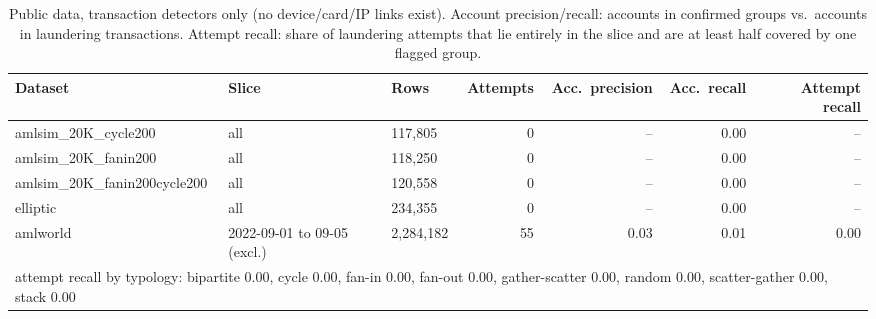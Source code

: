 \begin{table}[t]
\centering
\caption{Public data, transaction detectors only (no device/card/IP links exist). Account precision/recall:
accounts in confirmed groups vs.\ accounts in laundering transactions. Attempt recall: share of laundering
attempts that lie entirely in the slice and are at least half covered by one flagged group.}
\label{tab:public}
\begin{tabular}{lllrrrr}
\toprule
Dataset & Slice & Rows & Attempts & Acc.\ precision & Acc.\ recall & Attempt recall \\
\midrule
amlsim\_20K\_cycle200 & all & 117,805 & 0 & -- & 0.00 & -- \\
amlsim\_20K\_fanin200 & all & 118,250 & 0 & -- & 0.00 & -- \\
amlsim\_20K\_fanin200cycle200 & all & 120,558 & 0 & -- & 0.00 & -- \\
elliptic & all & 234,355 & 0 & -- & 0.00 & -- \\
amlworld & 2022-09-01 to 09-05 (excl.) & 2,284,182 & 55 & 0.03 & 0.01 & 0.00 \\
\multicolumn{7}{l}{\quad attempt recall by typology: bipartite 0.00, cycle 0.00, fan-in 0.00, fan-out 0.00, gather-scatter 0.00, random 0.00, scatter-gather 0.00, stack 0.00} \\
\bottomrule
\end{tabular}
\end{table}
